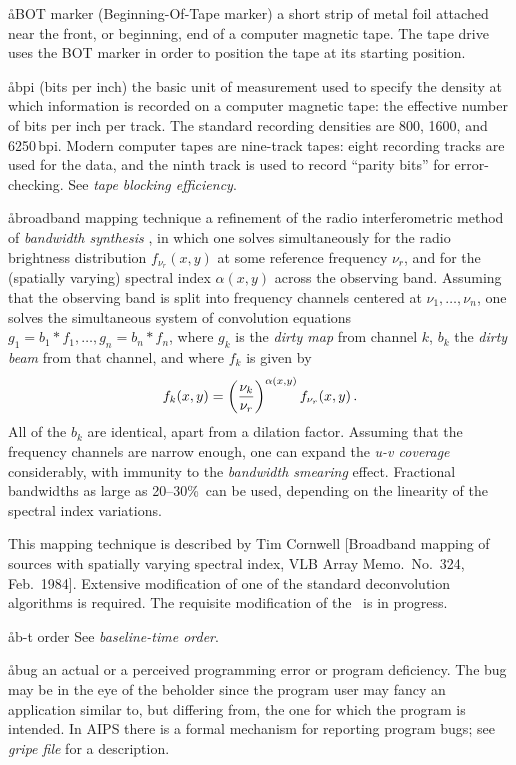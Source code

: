 \aa{BOT marker} (Beginning-Of-Tape marker)
a short strip of metal foil attached near the front, or
beginning, end of a computer magnetic tape.
The tape drive uses the BOT marker in order to position
the tape at its starting position.

\aa{bpi} (bits per inch)
the basic unit of measurement used to specify
the density at which information is recorded on a computer magnetic tape:
the effective number of bits per inch per track.
The standard recording densities are 800, 1600, and 6250\,bpi.
Modern computer tapes are nine-track tapes:
eight recording tracks are used for the data, and the ninth track
is used to record ``parity bits'' for error-checking.
See {\it tape blocking efficiency}.

\aa{broadband mapping technique}
a refinement of the radio interferometric method of
{\it bandwidth synthesis} \qv, in which one solves simultaneously
for the radio brightness distribution $f_{\nu_r}(x,y)$
at some reference frequency $\nu_r$, and for the (spatially varying)
spectral index $\alpha(x,y)$ across the observing band.
Assuming that the observing band is split into frequency
channels centered at $\nu_1,\dots,\nu_n$, one solves the simultaneous
system of convolution equations $g_1=b_1\ast f_1,\dots,g_n=b_n\ast f_n$,
where $g_k$ is the {\it dirty map} from channel $k$, $b_k$ the
{\it dirty beam} from that channel, and where $f_k$ is given by
$$f_k(x,y)=\left(\nu_k\over\nu_r\right)^{\alpha(x,y)}f_{\nu_r}(x,y)\,.$$
All of the $b_k$ are identical, apart from a dilation factor.
Assuming that the frequency channels are narrow enough, one can
expand the {\it u-v coverage} considerably,
with immunity to the {\it bandwidth smearing} effect.
Fractional bandwidths as large as 20--30\%\ can be used, depending
on the linearity of the spectral index variations.
\par
This mapping technique is described by Tim Cornwell [Broadband mapping
of sources with spatially varying spectral index,
VLB Array Memo.\ No.~324, Feb.~1984].
Extensive modification of one of the standard deconvolution algorithms
is required.
The requisite modification of the \hca\ is in progress.

\aa{b-t order} See {\it baseline-time order}.

\aa{bug}
an actual or a perceived programming error or program deficiency.
The bug may be in the eye of the beholder since the
program user may fancy an application similar to, but
differing from, the one for which the program is intended.
In AIPS there is a formal mechanism for reporting program bugs;
see {\it gripe file} for a description.

